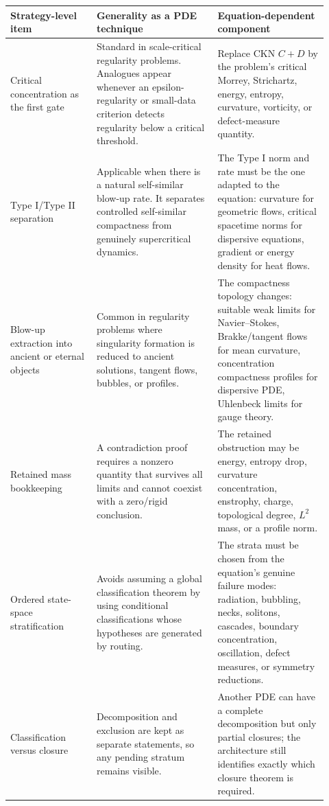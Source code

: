 \documentclass[11pt]{amsart}
\begin{document}
\begin{longtable}{@{}>{\raggedright\arraybackslash}p{0.25\linewidth}>{\raggedright\arraybackslash}p{0.35\linewidth}>{\raggedright\arraybackslash}p{0.32\linewidth}@{}}
\toprule
\textbf{Strategy-level item} & \textbf{Generality as a PDE technique} & \textbf{Equation-dependent component} \\
\midrule
\endhead
Critical concentration as the first gate & Standard in scale-critical regularity problems.  Analogues appear whenever an epsilon-regularity or small-data criterion detects regularity below a critical threshold. & Replace CKN \(C+D\) by the problem's critical Morrey, Strichartz, energy, entropy, curvature, vorticity, or defect-measure quantity. \\
Type I/Type II separation & Applicable when there is a natural self-similar blow-up rate.  It separates controlled self-similar compactness from genuinely supercritical dynamics. & The Type I norm and rate must be the one adapted to the equation: curvature for geometric flows, critical spacetime norms for dispersive equations, gradient or energy density for heat flows. \\
Blow-up extraction into ancient or eternal objects & Common in regularity problems where singularity formation is reduced to ancient solutions, tangent flows, bubbles, or profiles. & The compactness topology changes: suitable weak limits for Navier--Stokes, Brakke/tangent flows for mean curvature, concentration compactness profiles for dispersive PDE, Uhlenbeck limits for gauge theory. \\
Retained mass bookkeeping & A contradiction proof requires a nonzero quantity that survives all limits and cannot coexist with a zero/rigid conclusion. & The retained obstruction may be energy, entropy drop, curvature concentration, enstrophy, charge, topological degree, \(L^2\) mass, or a profile norm. \\
Ordered state-space stratification & Avoids assuming a global classification theorem by using conditional classifications whose hypotheses are generated by routing. & The strata must be chosen from the equation's genuine failure modes: radiation, bubbling, necks, solitons, cascades, boundary concentration, oscillation, defect measures, or symmetry reductions. \\
Classification versus closure & Decomposition and exclusion are kept as separate statements, so any pending stratum remains visible. & Another PDE can have a complete decomposition but only partial closures; the architecture still identifies exactly which closure theorem is required. \\

\end{longtable}
\end{document}
